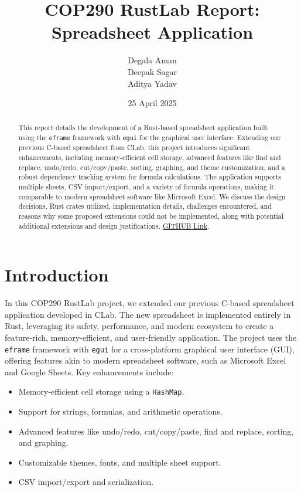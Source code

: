 \documentclass{article}
\title{COP290 RustLab Report: Spreadsheet Application}
\author{Degala Aman \\ Deepak Sagar \\ Aditya Yadav}
\date{25 April 2025}
\begin{document}
\maketitle

\begin{abstract}
This report details the development of a Rust-based spreadsheet application built using the \texttt{eframe} framework with \texttt{egui} for the graphical user interface. Extending our previous C-based spreadsheet from CLab, this project introduces significant enhancements, including memory-efficient cell storage, advanced features like find and replace, undo/redo, cut/copy/paste, sorting, graphing, and theme customization, and a robust dependency tracking system for formula calculations. The application supports multiple sheets, CSV import/export, and a variety of formula operations, making it comparable to modern spreadsheet software like Microsoft Excel. We discuss the design decisions, Rust crates utilized, implementation details, challenges encountered, and reasons why some proposed extensions could not be implemented, along with potential additional extensions and design justifications. 
\href {https://github.com/Aditya-Yadav1/COP290JUNG} {GITHUB Link}.
\end{abstract}

\section{Introduction}
In this COP290 RustLab project, we extended our previous C-based spreadsheet application developed in CLab. The new spreadsheet is implemented entirely in Rust, leveraging its safety, performance, and modern ecosystem to create a feature-rich, memory-efficient, and user-friendly application. The project uses the \texttt{eframe} framework with \texttt{egui} for a cross-platform graphical user interface (GUI), offering features akin to modern spreadsheet software, such as Microsoft Excel and Google Sheets. Key enhancements include:

\begin{itemize}
    \item Memory-efficient cell storage using a \texttt{HashMap}.
    \item Support for strings, formulas, and arithmetic operations.
    \item Advanced features like undo/redo, cut/copy/paste, find and replace, sorting, and graphing.
    \item Customizable themes, fonts, and multiple sheet support.
    \item CSV import/export and serialization.
\end{itemize}
\end{document}
